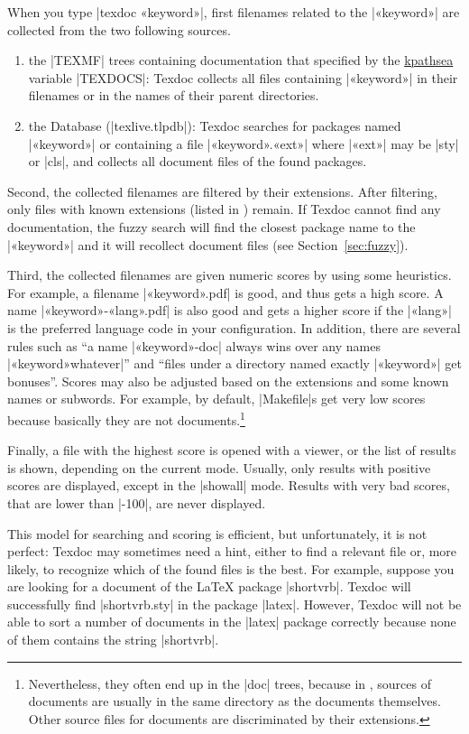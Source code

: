 \documentclass[draft]{texdoc-doc}
\begin{document}
When you type |texdoc «keyword»|, first filenames related to the |«keyword»|
are collected from the two following sources.
%
\begin{enumerate}
\item the |TEXMF| trees containing documentation that specified by the
  \href{https://www.tug.org/kpathsea/}{kpathsea} variable |TEXDOCS|: Texdoc
  collects all files containing |«keyword»| in their filenames or in the names
  of their parent directories.
\item the {\TL} Database (|texlive.tlpdb|): Texdoc searches for packages named
  |«keyword»| or containing a file |«keyword».«ext»| where |«ext»| may be |sty|
  or |cls|, and collects all document files of the found packages.
\end{enumerate}

Second, the collected filenames are filtered by their extensions. After
filtering, only files with known extensions (listed in ) remain.
If Texdoc cannot find any documentation, the fuzzy search will find the closest
package name to the |«keyword»| and it will recollect document files (see
Section~\ref{sec:fuzzy}).

Third, the collected filenames are given numeric scores by using some
heuristics. For example, a filename |«keyword».pdf| is good, and thus gets a
high score. A name |«keyword»-«lang».pdf| is also good and gets a higher score
if the |«lang»| is the preferred language code in your configuration. In
addition, there are several rules such as ``a name |«keyword»-doc| always wins
over any names |«keyword»whatever|'' and ``files under a directory named
exactly |«keyword»| get bonuses''. Scores may also be adjusted based on the
extensions and some known names or subwords. For example, by default,
|Makefile|s get very low scores because basically they are not
documents.\footnote{Nevertheless, they often end up in the |doc| trees,
because in {\TL}, sources of documents are usually in the same directory as the
documents themselves. Other source files for documents are discriminated by
their extensions.}

Finally, a file with the highest score is opened with a viewer, or the list
of results is shown, depending on the current mode. Usually, only results with
positive scores are displayed, except in the |showall| mode. Results with very
bad scores, that are lower than |-100|, are never displayed.

This model for searching and scoring is efficient, but unfortunately, it is not
perfect: Texdoc may sometimes need a hint, either to find a relevant file or,
more likely, to recognize which of the found files is the best. For example,
suppose you are looking for a document of the {\LaTeX} package |shortvrb|.
Texdoc will successfully find |shortvrb.sty| in the {\TL} package |latex|.
However, Texdoc will not be able to sort a number of documents in the |latex|
package correctly because none of them contains the string |shortvrb|.
\end{document}

